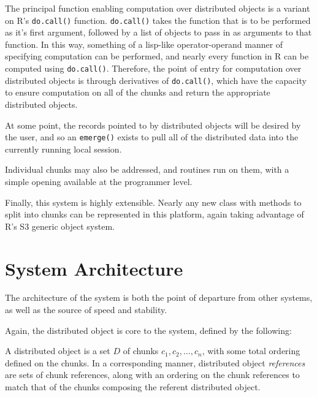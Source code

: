 \documentclass[a4paper,10pt]{article}
\begin{document}
The principal function enabling computation over distributed objects is a
variant on R's \texttt{do.call()} function.
\texttt{do.call()} takes the function that is to be performed as it's first
argument, followed by a list of objects to pass in as arguments to that
function.
In this way, something of a lisp-like operator-operand manner of specifying
computation can be performed, and nearly every function in R can be computed
using \texttt{do.call()}.
Therefore, the point of entry for computation over distributed objects is
through derivatives of \texttt{do.call()}, which have the capacity to
ensure computation on all of the chunks and return the appropriate distributed
objects.

At some point, the records pointed to by distributed objects will be desired by
the user, and so an \texttt{emerge()} exists to pull all of the distributed
data into the currently running local session.

Individual chunks may also be addressed, and routines run on them, with a
simple opening available at the programmer level.

Finally, this system is highly extensible.
Nearly any new class with methods to split into chunks can be represented in
this platform, again taking advantage of R's S3 generic object system.

\section{System Architecture}\label{sec:sys-arch}

The architecture of the system is both the point of departure from other systems, as well as the source of speed and stability.

Again, the distributed object is core to the system, defined by the following:

\begin{definition}
	\label{distobj}
	A distributed object is a set \(D\) of chunks \(c_1, c_2, \dots, c_n\),
	with some total ordering defined on the chunks.
	In a corresponding manner, distributed object \textit{references} are
	sets of chunk references, along with an ordering on the chunk
	references to match that of the chunks composing the referent
	distributed object.
\end{definition}
\end{document}
